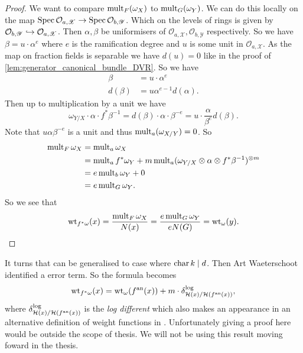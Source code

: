 \begin{proof}
	We want to compare $\operatorname{mult}_{F}(\omega_X)$ to $\operatorname{mult}_{G}(\omega_Y)$. 
	We can do this locally on the map $\operatorname{Spec} \mathcal{O}_{a, \mathscr X} \to \operatorname{Spec} \mathcal{O}_{b, \mathscr Y}$.
	Which on the levels of rings is given by $ \mathcal{O}_{b, \mathscr Y}\hookrightarrow  \mathcal{O}_{a, \mathscr X}$.
	Then $\alpha, \beta$ be uniformisers of $\mathcal{O}_{a, \mathscr X}, \mathcal{O}_{b, \mathscr Y}$ respectively. 
	So we have $\beta = u\cdot \alpha ^{e}$ where $e$ is the ramification degree and $u$ is some unit in $\mathcal{O}_{a, \mathscr X}$. 
	As the map on fraction fields is separable we have $d(u) = 0$ like in the proof of \cref{lem:generator_canonical_bundle_DVR}. 
	So we have
	\begin{align*}
		\beta &= u \cdot \alpha^e \\
		d(\beta) &= u \alpha^{e-1} d(\alpha)
	.\end{align*}
	Then up to multiplication by a unit we have \[
		\omega_{Y / X} \cdot \alpha \cdot  f^* \beta^{-1} = d(\beta)\cdot \alpha \cdot \beta^{-e} = u \cdot \frac{\alpha}{\beta^{e}} d(\beta)
	.\] 
	Note that $u \alpha \beta^{-e}$ is a unit and thus $\operatorname{mult}_a(\omega_{X / Y}) = 0$. 
	So 
	\begin{align*}
		\operatorname{mult}_{F} \omega_X &= \operatorname{mult}_{a} \omega _X\\
				   &=  \operatorname{mult}_{a} f^*\omega_Y +  m \operatorname{mult}_{a} (\omega_{Y / X} \otimes \alpha \otimes f^*\beta ^{-1})^{\otimes m} \\
				   &= e \operatorname{mult}_b \omega_Y + 0 \\
				   &= e\operatorname{mult}_{G}\omega_Y 
	.\end{align*} 
	So we see that 
	 \[
		 \operatorname{wt}_{f^* \omega}(x) = \frac{\operatorname{mult}_{F} \omega_X}{N(x)} = \frac{e\operatorname{mult}_G \omega_Y}{eN(G)} = \operatorname{wt}_{\omega}(y)
	.\] 
\end{proof}

\begin{remark}
	It turns that \label{prop:weightfunction_fullback} can be generalised to case where $\operatorname{char} k \mid d$. 
	Then Art Waeterschoot identified a error term. 
	So the formula becomes \[
		\operatorname{wt}_{f^* \omega}(x) = \operatorname{wt}_{\omega}(f{}^{\text{an}} (x)) + m \cdot \delta_{\mathcal{H} (x) / \mathcal{H} (f{}^{\text{an}}(x))}^{\text{log}}
	,\] 
	where $\delta_{\mathcal{H} (x) / \mathcal{H} (f{}^{\text{an}}(x))}^{\text{log}}$ is the \emph{log different} which also makes an appearance in an alternative definition of weight functions in \cite{temkinMetrizationDifferentialPluriforms2016a}.
	Unfortunately giving a proof here would be outside the scope of thesis.
	We will not be using this result moving foward in the thesis. 
\end{remark}


